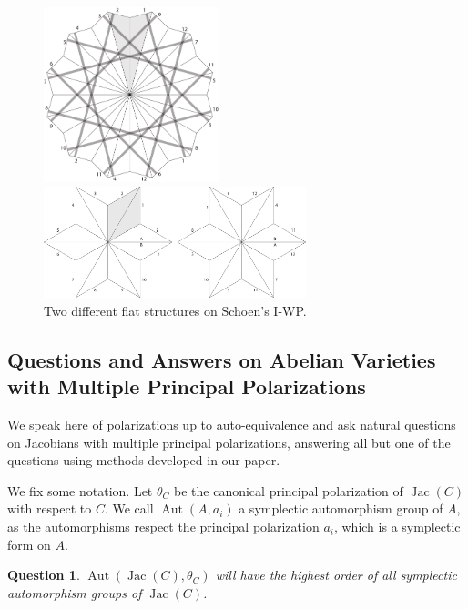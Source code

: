 \documentclass[12pt,reqno]{amsart}
\DeclareMathOperator{\Aut}{Aut}
\DeclareMathOperator{\Jac}{Jac}
\newtheorem*{question}{Question}
\theoremstyle{definition}
\theoremstyle{remark}
\begin{document}
\begin{figure}[htbp] 
\centering
\begin{minipage}{0.5\textwidth}
	\centering
	\includegraphics[width=2in]{figures/147_flat.pdf}
\end{minipage}%
\begin{minipage}{0.5\textwidth}
	\centering
	\includegraphics[width=3in]{figures/147_flat_2.pdf}
\end{minipage}
	\caption{Two different flat structures on Schoen's I-WP.}
	\label{fig:147}
\end{figure}

\subsection{Questions and Answers on Abelian Varieties with Multiple Principal Polarizations}
\label{sec:questions}

We speak here of polarizations up to auto-equivalence and ask natural questions on Jacobians with multiple principal polarizations, answering all but one of the questions using methods developed in our paper.

We fix some notation. Let $\theta_C$ be the canonical principal polarization of $\Jac(C)$ with respect to $C$. We call $\Aut(A, a_i)$ a symplectic automorphism group of $A$, as the automorphisms respect the principal polarization $a_i$, which is a symplectic form on $A$.

\begin{question} $\Aut(\Jac(C), \theta_C)$ will have the highest order of all symplectic automorphism groups of $\Jac(C)$. \end{question}
\end{document}
